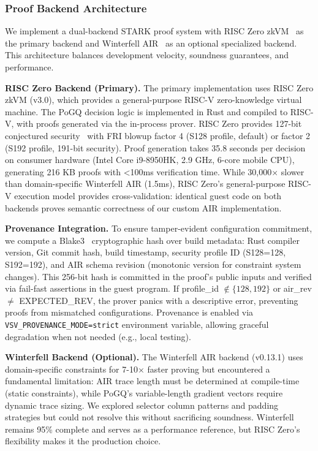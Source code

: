 \subsubsection{Proof Backend Architecture}

We implement a dual-backend STARK proof system with RISC Zero zkVM~\cite{risc0} as the primary backend and Winterfell AIR~\cite{winterfell} as an optional specialized backend. This architecture balances development velocity, soundness guarantees, and performance.

\textbf{RISC Zero Backend (Primary).} The primary implementation uses RISC Zero zkVM (v3.0), which provides a general-purpose RISC-V zero-knowledge virtual machine. The PoGQ decision logic is implemented in Rust and compiled to RISC-V, with proofs generated via the in-process prover. RISC Zero provides 127-bit conjectured security~\cite{risc0-security} with FRI blowup factor 4 (S128 profile, default) or factor 2 (S192 profile, 191-bit security). Proof generation takes 35.8 seconds per decision on consumer hardware (Intel Core i9-8950HK, 2.9 GHz, 6-core mobile CPU), generating 216 KB proofs with <100ms verification time. While 30,000$\times$ slower than domain-specific Winterfell AIR (1.5ms), RISC Zero's general-purpose RISC-V execution model provides cross-validation: identical guest code on both backends proves semantic correctness of our custom AIR implementation.

\textbf{Provenance Integration.} To ensure tamper-evident configuration commitment, we compute a Blake3~\cite{blake3} cryptographic hash over build metadata: Rust compiler version, Git commit hash, build timestamp, security profile ID (S128=128, S192=192), and AIR schema revision (monotonic version for constraint system changes). This 256-bit hash is committed in the proof's public inputs and verified via fail-fast assertions in the guest program. If profile\_id $\notin \{128, 192\}$ or air\_rev $\neq$ EXPECTED\_REV, the prover panics with a descriptive error, preventing proofs from mismatched configurations. Provenance is enabled via \texttt{VSV\_PROVENANCE\_MODE=strict} environment variable, allowing graceful degradation when not needed (e.g., local testing).

\textbf{Winterfell Backend (Optional).} The Winterfell AIR backend (v0.13.1) uses domain-specific constraints for 7-10$\times$ faster proving but encountered a fundamental limitation: AIR trace length must be determined at compile-time (static constraints), while PoGQ's variable-length gradient vectors require dynamic trace sizing. We explored selector column patterns and padding strategies but could not resolve this without sacrificing soundness. Winterfell remains 95\% complete and serves as a performance reference, but RISC Zero's flexibility makes it the production choice.

